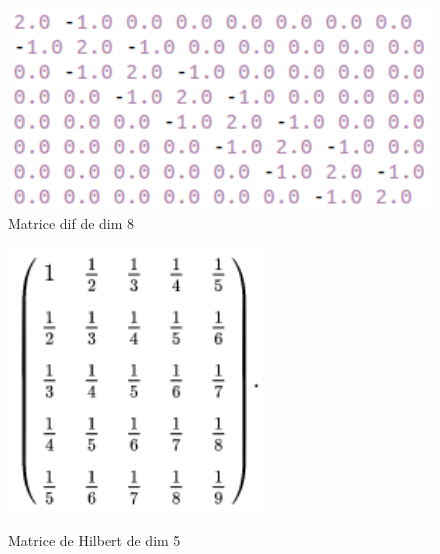 \documentclass[12,french]{report}
\begin{document}
\begin{figure}[H]
    \begin{minipage}[c]{.46\linewidth}
        \centering
        \includegraphics[width=1\textwidth]{./Images/dif_8}\\
        \caption*{Matrice dif de dim 8}
    \end{minipage}
    \hfill%
    \begin{minipage}[c]{.46\linewidth}
        \centering
        \includegraphics[width=0.6\textwidth]{./Images/H_5}\\
        \caption*{Matrice de Hilbert de dim 5}
    \end{minipage}
\end{figure}%
\end{document}
